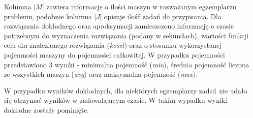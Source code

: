 \documentclass{article}
\begin{document}
    Kolumna $|M|$ zawiera informacje o ilości maszyn w rozważanym egzemplarzu problemu, podobnie kolumna $|J|$ opisuje ilość zadań do przypisania. 
    Dla rozwiązania dokładnego oraz aproksymacji zamieszczono informację o czasie potrzebnym do wyznaczenia rozwiązania (podany w sekundach), 
    wartości funkcji celu dla znalezionego rozwiązania (\textit{koszt}) oraz o stosunku wykorzystanej pojemności maszyny do pojemności całkowitej.
    W przypadku pojemności przedstawiono 3 wyniki - minimalna pojemność (\textit{min}), średnia pojemność liczona ze wszystkich maszyn (\textit{avg}) 
    oraz maksymalna pojemność (\textit{max}). 

    W przypadku wyników dokładnych, dla niektórych egzemplarzy zadań nie udało się otrzymać wyników w zadowalającym czasie. W takim wypadku 
    wyniki dokładne zostały pominięte.

    \begin{table}[H]
        \begin{center}
        \end{center}
        \caption{Wyniki dla przypadków testowych z pliku \textit{gap1.txt}. (*) $cap / cap_{max}$ przedstawia stosunek użytej pojemności maszyny 
            w wyznaczonym rozwiązaniu do maksymalnej pojemności maszyny. W tabeli przedstawiono minimalny, średni i maksymalny stosunek.}
        \label{wyniki-1}
    \end{table}
\end{document}
